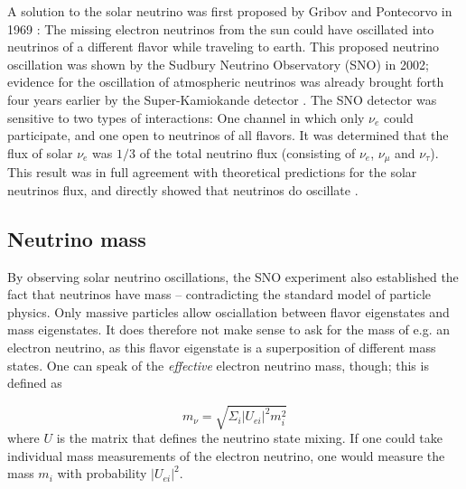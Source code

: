 \documentclass[
    a4paper, %
    fontsize=10pt, %
    twoside=false, %
    numbers=noenddot, %
    fontmethod=tex,
]{kaobook}
\begin{document}
A solution to the solar neutrino was first proposed by Gribov and Pontecorvo in 1969 : The missing electron neutrinos from the sun could have oscillated into neutrinos of a different flavor while traveling to earth. This proposed neutrino oscillation was shown by the Sudbury Neutrino Observatory (SNO) in 2002; evidence for the oscillation of atmospheric neutrinos was already brought forth four years earlier by the Super-Kamiokande detector . The SNO detector was sensitive to two types of interactions: One channel in which only $\nu_e$ could participate, and one open to neutrinos of all flavors. It was determined that the flux of solar $\nu_e$  was $1/3$ of the total neutrino flux (consisting of $\nu_e$, $\nu_\mu$ and $\nu_\tau$). This result was in full agreement with theoretical predictions for the solar neutrinos flux, and directly showed that neutrinos do oscillate .

\subsection{Neutrino mass}
By observing solar neutrino oscillations, the SNO experiment also established the fact that neutrinos have mass -- contradicting the standard model of particle physics. Only massive particles allow osciallation between flavor eigenstates and mass eigenstates. It does therefore not make sense to ask for the mass of e.g. an electron neutrino, as this flavor eigenstate is a superposition of different mass states. One can speak of the \textit{effective} electron neutrino mass, though; this is defined as

\begin{equation}
m_\nu = \sqrt{ \Sigma_i |U_{ei}|^2 m_i^2 }
\end{equation}
where $U$ is the matrix that defines the neutrino state mixing. If one could take individual mass measurements of the electron neutrino, one would measure the mass $m_i$ with probability $|U_{ei}|^2$.
\end{document}
